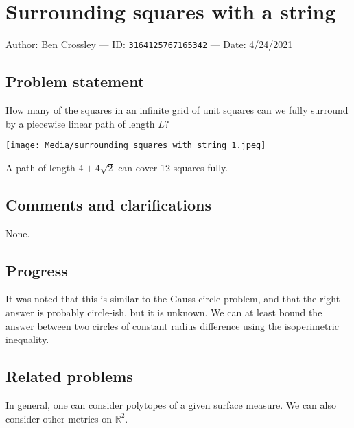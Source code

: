 
\section{Surrounding squares with a string}

Author: Ben Crossley --- ID: \verb`3164125767165342` --- Date: 4/24/2021

\subsection{Problem statement}

How many of the squares in an infinite grid of unit squares can we fully surround by a piecewise linear path of length $L$?

\BlankLine
\BlankLine

\texttt{[image: Media/surrounding\_squares\_with\_string\_1.jpeg]}

A path of length $4+4\sqrt2$ can cover 12 squares fully.

\subsection{Comments and clarifications}

None.

\subsection{Progress}

It was noted that this is similar to the Gauss circle problem, and that the right answer is probably circle-ish, but it is unknown. We can at least bound the answer between two circles of constant radius difference using the isoperimetric inequality.

\subsection{Related problems}

In general, one can consider polytopes of a given surface measure. We can also consider other metrics on $\mathbb{R}^2$.

